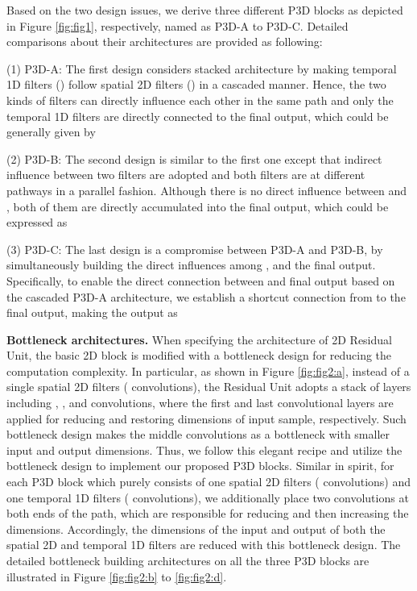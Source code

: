 \documentclass[10pt,twocolumn,letterpaper]{article}
\begin{document}
Based on the two design issues, we derive three different P3D blocks as depicted in Figure \ref{fig:fig1}, respectively, named as P3D-A to P3D-C. Detailed comparisons about their architectures are provided as following:

(1) P3D-A: The first design considers stacked architecture by making temporal 1D filters () follow spatial 2D filters () in a cascaded manner. Hence, the two kinds of filters can directly influence each other in the same path and only the temporal 1D filters are directly connected to the final output, which could be generally given by




(2) P3D-B: The second design is similar to the first one except that indirect influence between two filters are adopted and both filters are at different pathways in a parallel fashion. Although there is no direct influence between  and , both of them are directly accumulated into the final output, which could be expressed as


(3) P3D-C: The last design is a compromise between P3D-A and P3D-B, by simultaneously building the direct influences among ,  and the final output. Specifically, to enable the direct connection between  and final output based on the cascaded P3D-A architecture, we establish a shortcut connection from  to the final output, making the output  as


\textbf{Bottleneck architectures.}
When specifying the architecture of 2D Residual Unit, the basic 2D block is modified with a bottleneck design for reducing the computation complexity. In particular, as shown in Figure \ref{fig:fig2:a}, instead of a single spatial 2D filters ( convolutions), the Residual Unit adopts a stack of  layers including , , and  convolutions, where the first and last  convolutional layers are applied for reducing and restoring dimensions of input sample, respectively. Such bottleneck design makes the middle  convolutions as a bottleneck with smaller input and output dimensions. Thus, we follow this elegant recipe and utilize the bottleneck design to implement our proposed P3D blocks. Similar in spirit, for each P3D block which purely consists of one spatial 2D filters ( convolutions) and one temporal 1D filters ( convolutions), we additionally place two  convolutions at both ends of the path, which are responsible for reducing and then increasing the dimensions. Accordingly, the dimensions of the input and output of both the spatial 2D and temporal 1D filters are reduced with this bottleneck design. The detailed bottleneck building architectures on all the three P3D blocks are illustrated in Figure \ref{fig:fig2:b} to \ref{fig:fig2:d}.
\end{document}
